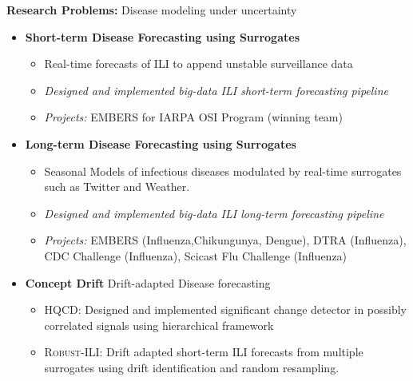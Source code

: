 \par{\textbf{Research Problems:} Disease modeling under uncertainty\vspace{0.5em}
\begin{itemize}
 \item  \textbf{Short-term Disease Forecasting using Surrogates}
   \begin{itemize}
     \item Real-time forecasts of ILI to append unstable surveillance data
     \item \textit{Designed and implemented big-data ILI short-term forecasting pipeline}  
     \item \textit{Projects:} EMBERS for IARPA OSI Program (winning team)
   \end{itemize}\vspace{0.25em}
 \item \textbf{Long-term Disease Forecasting using Surrogates}
   \begin{itemize}
     \item Seasonal Models of infectious diseases modulated by real-time surrogates such as Twitter and Weather.
     \item \textit{Designed and implemented big-data ILI long-term forecasting pipeline}  
     \item \textit{Projects:} EMBERS (Influenza,Chikungunya, Dengue), DTRA (Influenza),
       CDC Challenge (Influenza),  Scicast Flu Challenge (Influenza)
   \end{itemize}\vspace{0.25em}
 \item \textbf{Concept Drift} Drift-adapted Disease forecasting 
   \begin{itemize}
     \item {\textsc{HQCD}}: Designed and implemented significant change detector
       in possibly correlated signals using hierarchical framework
     \item {\textsc{Robust-ILI}}: Drift adapted short-term ILI forecasts from
       multiple surrogates using drift identification and random resampling.
   \end{itemize}
\end{itemize}
}
\fi
